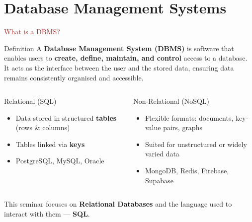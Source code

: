 

\section{Database Management Systems}

\begin{frame}{\textcolor{brown}{What is a DBMS?}}
  \begin{block}{Definition}
    A \textbf{Database Management System (DBMS)} is software that enables users to
    \textbf{create, define, maintain, and control} access to a database.
    It acts as the interface between the user and the stored data, ensuring data
    remains consistently organised and accessible.
  \end{block}

  \vspace{0.7em}
  \begin{columns}[T]
      \begin{block}{\faTable\; Relational (SQL)}
        \begin{itemize}
          \item Data stored in structured \textbf{tables} (rows \& columns)
          \item Tables linked via \textbf{keys}
          \item[\faAngleRight] PostgreSQL, MySQL, Oracle
        \end{itemize}
      \end{block}

      \begin{block}{\faProjectDiagram\; Non-Relational (NoSQL)}
        \begin{itemize}
          \item Flexible formats: documents, key-value pairs, graphs
          \item Suited for unstructured or widely varied data
          \item[\faAngleRight] MongoDB, Redis, Firebase, Supabase
        \end{itemize}
      \end{block}
  \end{columns}

  \vspace{0.5em}
  \centering\small
  This seminar focuses on \textbf{Relational Databases} and the language used to interact with them — \textbf{SQL}.
\end{frame}
